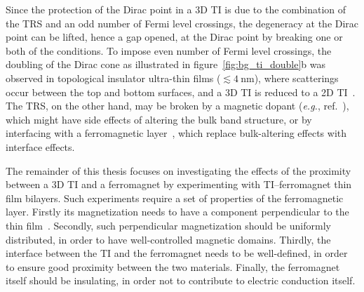Since the protection of the Dirac point in a 3D TI is due to the combination of the TRS and an odd number of Fermi level crossings, the degeneracy at the Dirac point can be lifted, hence a gap opened, at the Dirac point by breaking one or both of the conditions. To impose even number of Fermi level crossings, the doubling of the Dirac cone as illustrated in figure~\ref{fig:bg_ti_double}b was observed in topological insulator ultra-thin films ($\lesssim 4~\mathrm{nm}$), where scatterings occur between the top and bottom surfaces, and a 3D TI is reduced to a 2D TI~\cite{ARPES_thickness}. The TRS, on the other hand, may be broken by a magnetic dopant (\textit{e.g.}, ref.~\cite{Chang2013}), which might have side effects of altering the bulk band structure, or by interfacing with a ferromagnetic layer~\cite{TI_Col, QAH_TI_Yu, MnSe}, which replace bulk-altering effects with interface effects.

The remainder of this thesis focuses on investigating the effects of the proximity between a 3D TI and a ferromagnet by experimenting with TI--ferromagnet thin film bilayers. Such experiments require a set of properties of the ferromagnetic layer. Firstly its magnetization needs to have a component perpendicular to the thin film~\cite{MnSe}. Secondly, such perpendicular magnetization should be uniformly distributed, in order to have well-controlled magnetic domains. Thirdly, the interface between the TI and the ferromagnet needs to be well-defined, in order to ensure good proximity between the two materials. Finally, the ferromagnet itself should be insulating, in order not to contribute to electric conduction itself.